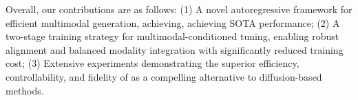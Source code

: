 

Overall, our contributions are as follows: (1) A novel autoregressive framework for efficient multimodal generation, achieving, achieving SOTA performance; (2) A two-stage training strategy for multimodal-conditioned tuning, enabling robust alignment and balanced modality integration with significantly reduced training cost; (3) Extensive experiments demonstrating the superior efficiency, controllability, and fidelity of \model as a compelling alternative to diffusion-based methods.






